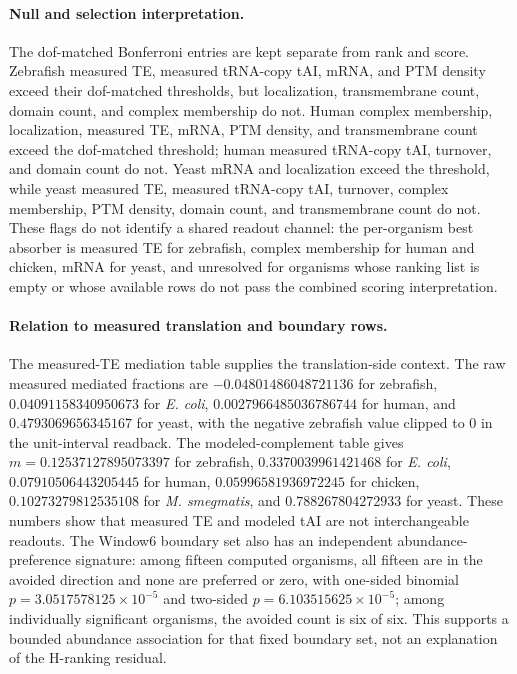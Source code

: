\paragraph{Null and selection interpretation.}
The dof-matched Bonferroni entries are kept separate from rank and score.  Zebrafish measured TE, measured tRNA-copy tAI, mRNA, and PTM density exceed their dof-matched thresholds, but localization, transmembrane count, domain count, and complex membership do not.  Human complex membership, localization, measured TE, mRNA, PTM density, and transmembrane count exceed the dof-matched threshold; human measured tRNA-copy tAI, turnover, and domain count do not.  Yeast mRNA and localization exceed the threshold, while yeast measured TE, measured tRNA-copy tAI, turnover, complex membership, PTM density, domain count, and transmembrane count do not.  These flags do not identify a shared readout channel: the per-organism best absorber is measured TE for zebrafish, complex membership for human and chicken, mRNA for yeast, and unresolved for organisms whose ranking list is empty or whose available rows do not pass the combined scoring interpretation.

\paragraph{Relation to measured translation and boundary rows.}
The measured-TE mediation table supplies the translation-side context.  The raw measured mediated fractions are $-0.04801486048721136$ for zebrafish, $0.04091158340950673$ for \emph{E. coli}, $0.0027966485036786744$ for human, and $0.4793069656345167$ for yeast, with the negative zebrafish value clipped to $0$ in the unit-interval readback.  The modeled-complement table gives $m=0.12537127895073397$ for zebrafish, $0.3370039961421468$ for \emph{E. coli}, $0.07910506443205445$ for human, $0.05996581936972245$ for chicken, $0.10273279812535108$ for \emph{M. smegmatis}, and $0.788267804272933$ for yeast.  These numbers show that measured TE and modeled tAI are not interchangeable readouts.  The Window6 boundary set also has an independent abundance-preference signature: among fifteen computed organisms, all fifteen are in the avoided direction and none are preferred or zero, with one-sided binomial $p=3.0517578125\times 10^{-5}$ and two-sided $p=6.103515625\times 10^{-5}$; among individually significant organisms, the avoided count is six of six.  This supports a bounded abundance association for that fixed boundary set, not an explanation of the H-ranking residual.

